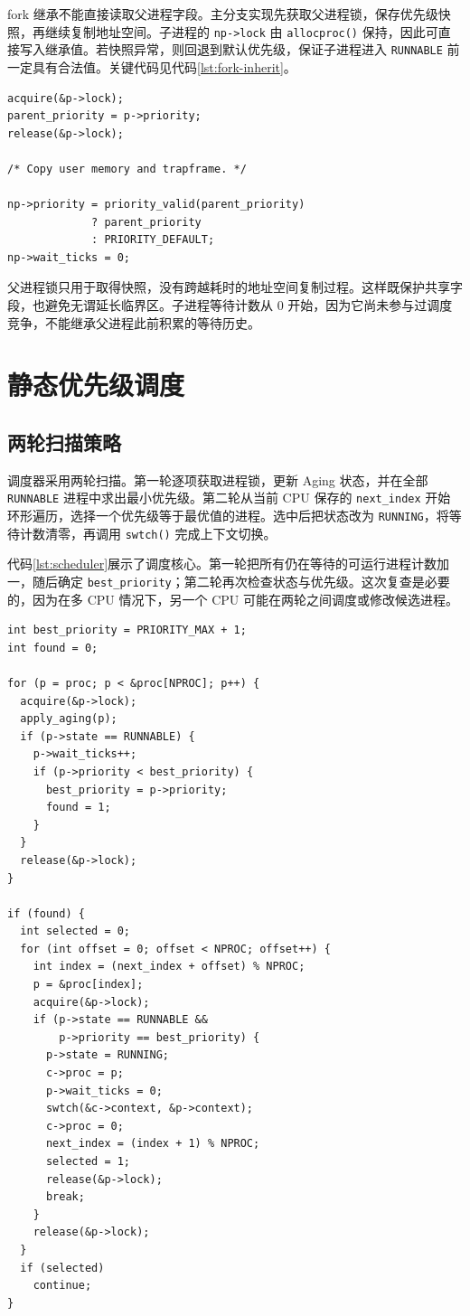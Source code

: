 fork 继承不能直接读取父进程字段。主分支实现先获取父进程锁，保存优先级快照，再继续复制地址空间。子进程的 \texttt{np->lock} 由 \texttt{allocproc()} 保持，因此可直接写入继承值。若快照异常，则回退到默认优先级，保证子进程进入 \texttt{RUNNABLE} 前一定具有合法值。关键代码见代码\ref{lst:fork-inherit}。

\begin{lstlisting}[caption={fork 中的优先级继承（\texttt{kernel/proc.c}）},label={lst:fork-inherit}]
acquire(&p->lock);
parent_priority = p->priority;
release(&p->lock);

/* Copy user memory and trapframe. */

np->priority = priority_valid(parent_priority)
             ? parent_priority
             : PRIORITY_DEFAULT;
np->wait_ticks = 0;
\end{lstlisting}

父进程锁只用于取得快照，没有跨越耗时的地址空间复制过程。这样既保护共享字段，也避免无谓延长临界区。子进程等待计数从 0 开始，因为它尚未参与过调度竞争，不能继承父进程此前积累的等待历史。

\section{静态优先级调度}

\subsection{两轮扫描策略}

调度器采用两轮扫描。第一轮逐项获取进程锁，更新 Aging 状态，并在全部 \texttt{RUNNABLE} 进程中求出最小优先级。第二轮从当前 CPU 保存的 \texttt{next\_index} 开始环形遍历，选择一个优先级等于最优值的进程。选中后把状态改为 \texttt{RUNNING}，将等待计数清零，再调用 \texttt{swtch()} 完成上下文切换。

代码\ref{lst:scheduler}展示了调度核心。第一轮把所有仍在等待的可运行进程计数加一，随后确定 \texttt{best\_priority}；第二轮再次检查状态与优先级。这次复查是必要的，因为在多 CPU 情况下，另一个 CPU 可能在两轮之间调度或修改候选进程。

\begin{lstlisting}[caption={静态优先级调度与同级轮转核心（\texttt{kernel/proc.c}）},label={lst:scheduler}]
int best_priority = PRIORITY_MAX + 1;
int found = 0;

for (p = proc; p < &proc[NPROC]; p++) {
  acquire(&p->lock);
  apply_aging(p);
  if (p->state == RUNNABLE) {
    p->wait_ticks++;
    if (p->priority < best_priority) {
      best_priority = p->priority;
      found = 1;
    }
  }
  release(&p->lock);
}

if (found) {
  int selected = 0;
  for (int offset = 0; offset < NPROC; offset++) {
    int index = (next_index + offset) % NPROC;
    p = &proc[index];
    acquire(&p->lock);
    if (p->state == RUNNABLE &&
        p->priority == best_priority) {
      p->state = RUNNING;
      c->proc = p;
      p->wait_ticks = 0;
      swtch(&c->context, &p->context);
      c->proc = 0;
      next_index = (index + 1) % NPROC;
      selected = 1;
      release(&p->lock);
      break;
    }
    release(&p->lock);
  }
  if (selected)
    continue;
}
\end{lstlisting}

